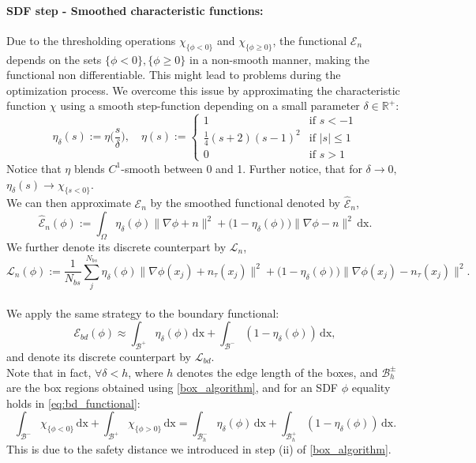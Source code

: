 \documentclass[12pt,openany]{book}
\theoremstyle{plainnormal}
\theoremstyle{remark}
\begin{document}
\paragraph{SDF step - Smoothed characteristic functions:} Due to the thresholding operations $\chi_{\{\phi<0\}}$ and $\chi_{\{\phi\geq 0\}}$, the functional $\mathcal E_n$ depends on the sets $\{\phi<0\}, \{\phi\geq0\}$ in a non-smooth manner, making the functional non differentiable. This might lead to problems during the optimization process. We overcome this issue by approximating the characteristic function $\chi$ using a smooth step-function depending on a small parameter $\delta \in \mathbb R^+$:
$$\eta_\delta(s) := \eta\Big(\frac{s}{\delta}\Big), \quad \eta(s) :=
    \begin{cases}
1 & \text{if } s < -1 \\
\frac{1}{4} (s+2)(s-1)^2 & \text{if } |s| \leq 1 \\
0 & \text{if }s > 1
\end{cases}
$$
Notice that $\eta$ blends $C^1$-smooth between 0 and 1. Further notice, that for $\delta \rightarrow 0,$ $\eta_\delta(s) \rightarrow\chi_{\{s<0\}}$.\\
We can then approximate $\mathcal E_n$ by the smoothed functional denoted by $\hat {\mathcal{E}}_n$,
$$\hat{\mathcal E}_n(\phi) := \int_\Omega \eta_\delta(\phi)\|\nabla \phi + n\|^2 + \big(1 - \eta_\delta(\phi)\big)\|\nabla \phi - n\|^2 \, \mathrm{dx}.$$
We further denote its discrete counterpart by $\mathcal{L}_n$, $$\mathcal L_n(\phi) := \frac{1}{N_{bs}}\sum_j^{N_{bs}}
\eta_\delta(\phi) \|\nabla \phi(x_j) + n_\tau(x_j)\|^2 + \big(1 - \eta_\delta(\phi)\big) \|\nabla \phi(x_j) - n_\tau(x_j)\|^2.$$\\
We apply the same strategy to the boundary functional: 
\begin{equation}\label{eq:bd_functional}
    \mathcal{E}_{bd}(\phi) \approx \int_\mathcal{B^+} \eta_\delta(\phi) \,\mathrm{dx} + \int_{\mathcal{B^-}}(1-\eta_\delta(\phi)) \,\mathrm{dx},
\end{equation}
and denote its discrete counterpart by $\mathcal{L}_{bd}$.\\
Note that in fact, $\forall \delta < h$, where $h$ denotes the edge length of the boxes, and $\mathcal{B}_h^{\pm}$ are the box regions obtained using \cref{box_algorithm}, and for an SDF $\phi$ equality holds in \cref{eq:bd_functional}:
 $$\int_{\mathcal B^-}\chi_{\{\phi < 0\}}\,\mathrm{dx} + \int_{\mathcal B^+}\chi_{\{\phi > 0\}} \,\mathrm{dx} = \int_{\mathcal{B}^{-}_h} \eta_\delta(\phi) \,\mathrm{dx} + \int_{\mathcal{B}^{+}_h}(1-\eta_\delta(\phi)) \,\mathrm{dx}.$$
This is due to the safety distance we introduced in step (ii) of \cref{box_algorithm}. 
\end{document}
